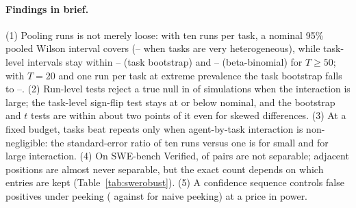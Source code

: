 \paragraph{Findings in brief.} (1) Pooling runs is not merely loose: with ten runs per task, a nominal 95\% pooled Wilson interval covers \covWilsonTenRuns{} (\covrobWilsonMin{}--\covrobWilsonMax{} when tasks are very heterogeneous), while task-level intervals stay within \covrobBootMin{}--\covrobBootMax{} (task bootstrap) and \covrobBBMin{}--\covrobBBMax{} (beta-binomial) for $T\ge 50$; with $T=20$ and one run per task at extreme prevalence the task bootstrap falls to \covrobBootSmallMin{}--\covrobBootSmallMax{}. (2) Run-level tests reject a true null in \typeIPoolMc{} of simulations when the interaction is large; the task-level sign-flip test stays at or below nominal, and the bootstrap and $t$ tests are within about two points of it even for skewed differences. (3) At a fixed budget, tasks beat repeats only when agent-by-task interaction is non-negligible: the standard-error ratio of ten runs versus one is \allocRatioLow{} for small and \allocRatioHigh{} for large interaction. (4) On SWE-bench Verified, \sweIndistHolm{} of pairs are not separable; adjacent positions are almost never separable, but the exact count depends on which entries are kept (Table~\ref{tab:swerobust}). (5) A confidence sequence controls false positives under peeking (\seqNullSeq{} against \seqNullPeek{} for naive peeking) at a price in power. \REALFINDINGS
